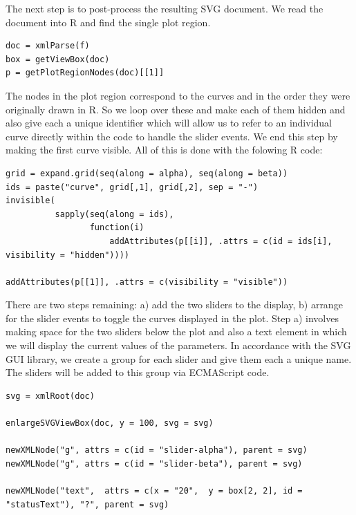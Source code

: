 \documentclass[article]{jss}
\begin{document}
The next step is to post-process the resulting SVG document.
We read the document into R and find the single plot region.
\begin{verbatim}
doc = xmlParse(f)
box = getViewBox(doc)
p = getPlotRegionNodes(doc)[[1]]
\end{verbatim}
The nodes in the plot region correspond to the curves and in the order
they were originally drawn in R.  So we loop over these and make each
of them hidden and also give each a unique identifier which will allow
us to refer to an individual curve directly within the code to handle
the slider events.  We end this step by making the first curve
visible. 
All of this is done with the folowing R code:
\begin{verbatim}
grid = expand.grid(seq(along = alpha), seq(along = beta))
ids = paste("curve", grid[,1], grid[,2], sep = "-")
invisible(
          sapply(seq(along = ids),
                 function(i)
                     addAttributes(p[[i]], .attrs = c(id = ids[i], visibility = "hidden"))))

addAttributes(p[[1]], .attrs = c(visibility = "visible"))
\end{verbatim}

There are two steps remaining: a) add the two sliders to the display,
b) arrange for the slider events to toggle the curves displayed in the plot.
Step a) involves making space for the two sliders below the plot
and also a text element in which we will display the current values
of the parameters.
In accordance with the SVG GUI library, we create a group for each
slider and give them each a unique name. The sliders will be added to
this group via ECMAScript code.
\begin{verbatim}
svg = xmlRoot(doc)

enlargeSVGViewBox(doc, y = 100, svg = svg)

newXMLNode("g", attrs = c(id = "slider-alpha"), parent = svg)
newXMLNode("g", attrs = c(id = "slider-beta"), parent = svg)

newXMLNode("text",  attrs = c(x = "20",  y = box[2, 2], id = "statusText"), "?", parent = svg)
\end{verbatim}
\end{document}
